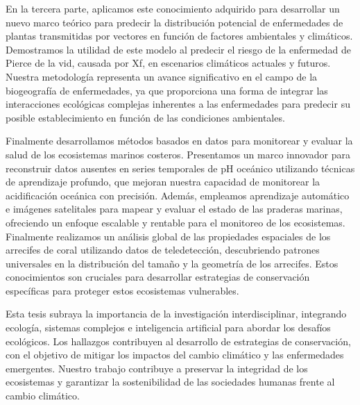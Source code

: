 En la tercera parte, aplicamos este conocimiento adquirido para desarrollar un
nuevo marco teórico para predecir la distribución potencial de enfermedades de
plantas transmitidas por vectores en función de factores ambientales y
climáticos. Demostramos la utilidad de este modelo al predecir el riesgo de la
enfermedad de Pierce de la vid, causada por Xf, en
escenarios climáticos actuales y futuros. Nuestra metodología representa un
avance significativo en el campo de la biogeografía de enfermedades, ya que
proporciona una forma de integrar las interacciones ecológicas complejas
inherentes a las enfermedades para predecir su posible establecimiento en
función de las condiciones ambientales.

Finalmente desarrollamos métodos basados en datos para monitorear y
evaluar la salud de los ecosistemas marinos costeros. Presentamos un marco
innovador para reconstruir datos ausentes en series temporales de pH oceánico
utilizando técnicas de aprendizaje profundo, que mejoran nuestra capacidad de
monitorear la acidificación oceánica con precisión. Además, empleamos
aprendizaje automático e imágenes satelitales para mapear y evaluar el estado
de las praderas marinas, ofreciendo un enfoque escalable y rentable para el
monitoreo de los ecosistemas. Finalmente realizamos un análisis global de las
propiedades espaciales de los arrecifes de coral utilizando datos de
teledetección, descubriendo patrones universales en la distribución del tamaño
y la geometría de los arrecifes. Estos conocimientos son cruciales para
desarrollar estrategias de conservación específicas para proteger estos
ecosistemas vulnerables.

Esta tesis subraya la importancia de la investigación interdisciplinar,
integrando ecología, sistemas complejos e inteligencia artificial para abordar
los desafíos ecológicos. Los hallazgos contribuyen al desarrollo de estrategias
de conservación, con el objetivo de mitigar los impactos del cambio climático y
las enfermedades emergentes. Nuestro trabajo contribuye a
preservar la integridad de los ecosistemas y garantizar la sostenibilidad de
las sociedades humanas frente al cambio climático.

\vfill